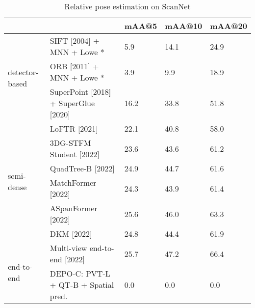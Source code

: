 \begin{table}[h!]
\centering
\caption{Relative pose estimation on ScanNet}
\label{tab:scannet_rel}
\begin{tabular}{lllll}
\toprule
 &  & mAA@5 & mAA@10 & mAA@20 \\
\midrule
\multirow[c]{3}{*}{detector-based} & SIFT [2004] \cite{lowe2004distinctive} + MNN + Lowe * & {\cellcolor[HTML]{F67F4B}} \color[HTML]{F1F1F1} 5.9 & {\cellcolor[HTML]{FDAD60}} \color[HTML]{000000} 14.1 & {\cellcolor[HTML]{FED27F}} \color[HTML]{000000} 24.9 \\
 & ORB [2011] \cite{rublee2011orb} + MNN + Lowe * & {\cellcolor[HTML]{E54E35}} \color[HTML]{F1F1F1} 3.9 & {\cellcolor[HTML]{F57245}} \color[HTML]{F1F1F1} 9.9 & {\cellcolor[HTML]{FBA35C}} \color[HTML]{000000} 18.9 \\
 & SuperPoint [2018] \cite{detone2018superpoint} + SuperGlue [2020] \cite{sarlin2020superglue} & {\cellcolor[HTML]{CBE982}} \color[HTML]{000000} 16.2 & {\cellcolor[HTML]{9BD469}} \color[HTML]{000000} 33.8 & {\cellcolor[HTML]{73C264}} \color[HTML]{000000} 51.8 \\
\cline{1-5}
\multirow[c]{6}{*}{semi-dense} & LoFTR [2021] \cite{sun2021loftr} & {\cellcolor[HTML]{39A758}} \color[HTML]{F1F1F1} 22.1 & {\cellcolor[HTML]{33A456}} \color[HTML]{F1F1F1} 40.8 & {\cellcolor[HTML]{2DA155}} \color[HTML]{F1F1F1} 58.0 \\
 & 3DG-STFM Student [2022] \cite{mao20223dg} & {\cellcolor[HTML]{148E4B}} \color[HTML]{F1F1F1} 23.6 & {\cellcolor[HTML]{138C4A}} \color[HTML]{F1F1F1} 43.6 & {\cellcolor[HTML]{148E4B}} \color[HTML]{F1F1F1} 61.2 \\
 & QuadTree-B [2022] \cite{tang2022quadtree} & {\cellcolor[HTML]{07753E}} \color[HTML]{F1F1F1} 24.9 & {\cellcolor[HTML]{0D8044}} \color[HTML]{F1F1F1} 44.7 & {\cellcolor[HTML]{128A49}} \color[HTML]{F1F1F1} 61.6 \\
 & MatchFormer [2022] \cite{wang2022matchformer} & {\cellcolor[HTML]{0D8044}} \color[HTML]{F1F1F1} 24.3 & {\cellcolor[HTML]{118848}} \color[HTML]{F1F1F1} 43.9 & {\cellcolor[HTML]{138C4A}} \color[HTML]{F1F1F1} 61.4 \\
 & ASpanFormer [2022] \cite{chen2022aspanformer} & {\cellcolor[HTML]{006837}} \color[HTML]{F1F1F1} 25.6 & {\cellcolor[HTML]{06733D}} \color[HTML]{F1F1F1} 46.0 & {\cellcolor[HTML]{0B7D42}} \color[HTML]{F1F1F1} 63.3 \\
 & DKM [2022] \cite{edstedt2022deep} & {\cellcolor[HTML]{08773F}} \color[HTML]{F1F1F1} 24.8 & {\cellcolor[HTML]{0F8446}} \color[HTML]{F1F1F1} 44.4 & {\cellcolor[HTML]{118848}} \color[HTML]{F1F1F1} 61.9 \\
\cline{1-5}
\multirow[c]{2}{*}{end-to-end} & Multi-view end-to-end [2022] \cite{roessle2022end2end} & {\cellcolor[HTML]{006837}} \color[HTML]{F1F1F1} 25.7 & {\cellcolor[HTML]{006837}} \color[HTML]{F1F1F1} 47.2 & {\cellcolor[HTML]{006837}} \color[HTML]{F1F1F1} 66.4 \\
 & DEPO-C: PVT-L + QT-B + Spatial pred. & {\cellcolor[HTML]{A50026}} \color[HTML]{F1F1F1} 0.0 & {\cellcolor[HTML]{A50026}} \color[HTML]{F1F1F1} 0.0 & {\cellcolor[HTML]{A50026}} \color[HTML]{F1F1F1} 0.0 \\
\cline{1-5}
\bottomrule
\end{tabular}
\end{table}
